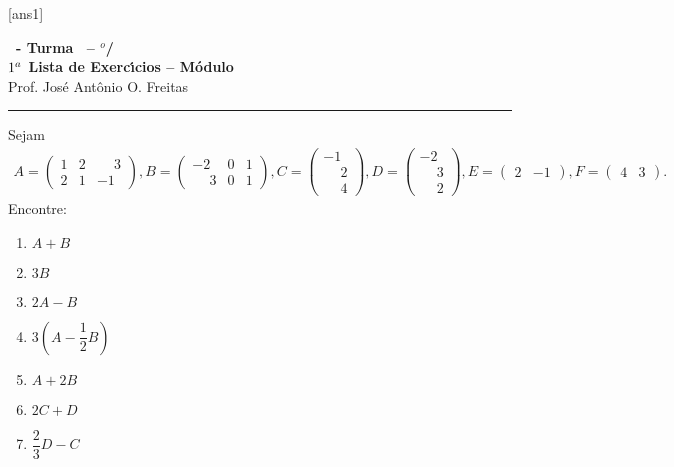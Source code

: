 \documentclass[12pt]{exam}
\begin{document}
  [ans1]
  \begin{center}
    {\Large\bf \disciplina\ - Turma \turma\ -- \semestre$^{o}$/\ano} \\ \vspace{9pt} {\large\bf
        $1^a$ Lista de Exerc{\'\i}cios -- Módulo \numeromodulo}\\ \vspace{9pt} Prof. Jos{\'e} Ant{\^o}nio O. Freitas
  \end{center}
  \hrule


\begin{exercicio}
  \label{operacoes_matrizes} Sejam
    \begin{align*}
        A = \begin{pmatrix}1 & 2 & \phantom{-} 3\\2 & 1 & -1\end{pmatrix},
        B = \begin{pmatrix}-2 & 0 & 1\\\phantom{-} 3 & 0 & 1\end{pmatrix},
        C = \begin{pmatrix}-1\\ \phantom{-} 2\\\phantom{-} 4\end{pmatrix},
        D = \begin{pmatrix}-2\\ \phantom{-} 3\\\phantom{-} 2\end{pmatrix},
        E = \begin{pmatrix}2 & -1\end{pmatrix},
        F = \begin{pmatrix}4 & 3\end{pmatrix}.
    \end{align*}
    Encontre:
    \begin{multicols}{3}
        \begin{enumerate}[label={\alph*})]
            \item $A + B$
            \item $3B$
            \item $2A - B$
            \item $3(A - \dfrac{1}{2}B)$
            \item $A + 2B$
            \item $2C + D$
            \item $\dfrac{2}{3}D - C$

\end{enumerate}
\end{multicols}
\end{exercicio}
\end{document}
